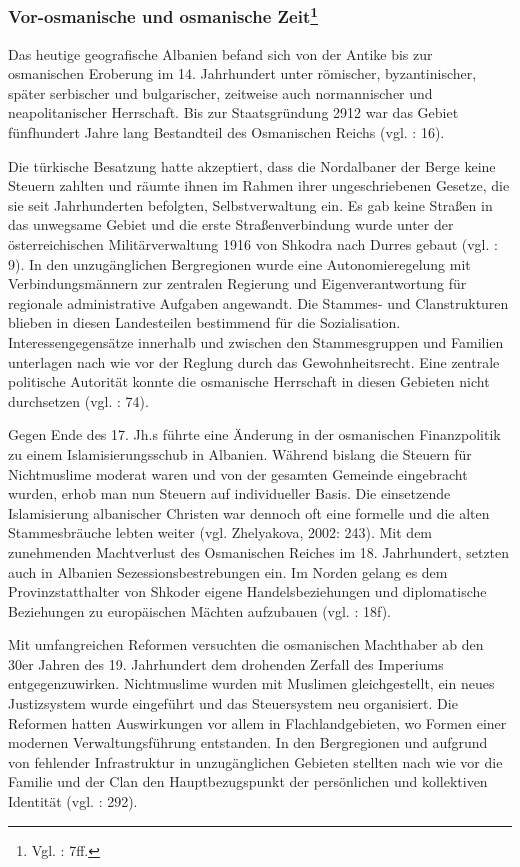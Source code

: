 \subsubsection[Vor-osmanische und osmanische Zeit]{Vor-osmanische und osmanische Zeit\footnote{Vgl. \cite{vollmer07} : 7ff.}}
Das heutige geografische Albanien befand sich von der Antike bis zur osmanischen Eroberung im 14. Jahrhundert unter römischer, byzantinischer, später serbischer und bulgarischer, zeitweise auch normannischer und neapolitanischer Herrschaft. Bis zur Staatsgründung 2912 war das Gebiet fünfhundert Jahre lang Bestandteil des Osmanischen Reichs (vgl. \cite{winnifrith} : 16).\par
Die türkische Besatzung hatte akzeptiert, dass die Nordalbaner der Berge keine Steuern zahlten und räumte ihnen im Rahmen ihrer ungeschriebenen Gesetze, die sie seit Jahrhunderten befolgten, Selbstverwaltung ein. Es gab keine Straßen in das unwegsame Gebiet und die erste Straßenverbindung wurde unter der österreichischen Militärverwaltung 1916 von Shkodra nach Durres gebaut (vgl. \cite{hasluk} : 9). In den unzugänglichen Bergregionen wurde eine Autonomieregelung mit Verbindungsmännern zur zentralen Regierung und Eigenverantwortung für regionale administrative Aufgaben angewandt. Die Stammes- und Clanstrukturen blieben in diesen Landesteilen bestimmend für die Sozialisation. Interessengegensätze innerhalb und zwischen den Stammesgruppen und Familien unterlagen nach wie vor der Reglung durch das Gewohnheitsrecht. Eine zentrale politische Autorität konnte die osmanische Herrschaft in diesen Gebieten nicht durchsetzen (vgl. \cite{hens99} : 74).\par
Gegen Ende des 17. Jh.s führte eine Änderung in der osmanischen Finanzpolitik zu einem Islamisierungsschub in Albanien. Während bislang die Steuern für Nichtmuslime moderat waren und von der gesamten Gemeinde eingebracht wurden, erhob man nun Steuern auf individueller Basis. Die einsetzende Islamisierung albanischer Christen war dennoch oft eine formelle und die alten Stammesbräuche lebten weiter (vgl. Zhelyakova, 2002: 243). Mit dem zunehmenden Machtverlust des Osmanischen Reiches im 18. Jahrhundert, setzten auch in Albanien Sezessionsbestrebungen ein. Im Norden gelang es dem Provinzstatthalter von Shkoder eigene Handelsbeziehungen und diplomatische Beziehungen zu europäischen Mächten aufzubauen (vgl. \cite{vickers} : 18f).\par
Mit umfangreichen Reformen versuchten die osmanischen Machthaber ab den 30er Jahren des 19. Jahrhundert dem drohenden Zerfall des Imperiums entgegenzuwirken. Nichtmuslime wurden mit Muslimen gleichgestellt, ein neues Justizsystem wurde eingeführt und das Steuersystem neu organisiert. Die Reformen hatten Auswirkungen vor allem in Flachlandgebieten, wo Formen einer modernen Verwaltungsführung entstanden. In den Bergregionen und aufgrund von fehlender Infrastruktur in unzugänglichen Gebieten stellten nach wie vor die Familie und der Clan den Hauptbezugspunkt der persönlichen und kollektiven Identität (vgl. \cite{kaser} : 292).\par
